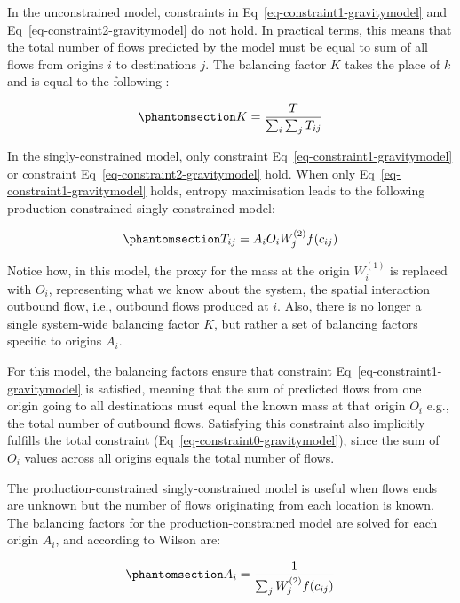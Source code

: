 \documentclass[
  10pt,
  letterpaper,
]{article}
\begin{document}
In the unconstrained model, constraints in
Eq~\ref{eq-constraint1-gravitymodel} and
Eq~\ref{eq-constraint2-gravitymodel} do not hold. In practical terms,
this means that the total number of flows predicted by the model must be
equal to sum of all flows from origins \(i\) to destinations \(j\). The
balancing factor \(K\) takes the place of \(k\) and is equal to the
following \citep[as specified in][ and
\citet{fotheringham_spatial_1984}]{cliff_evaluating_1974}:

\begin{equation}\phantomsection\label{eq-total-flow-balancing-factor}{
K=\frac{T}{\sum_i\sum_j T_{ij}}
}\end{equation}

In the singly-constrained model, only constraint
Eq~\ref{eq-constraint1-gravitymodel} or constraint
Eq~\ref{eq-constraint2-gravitymodel} hold. When only
Eq~\ref{eq-constraint1-gravitymodel} holds, entropy maximisation leads
to the following production-constrained singly-constrained model:

\begin{equation}\phantomsection\label{eq-production-constrained-gravitymodel}{
T_{ij} = A_i O_i W_j^{(2)} f(c_{ij})
}\end{equation}

Notice how, in this model, the proxy for the mass at the origin
\(W_i^{(1)}\) is replaced with \(O_i\), representing what we know about
the system, the spatial interaction outbound flow, i.e., outbound flows
produced at \(i\). Also, there is no longer a single system-wide
balancing factor \(K\), but rather a set of balancing factors specific
to origins \(A_i\).

For this model, the balancing factors ensure that constraint
Eq~\ref{eq-constraint1-gravitymodel} is satisfied, meaning that the sum
of predicted flows from one origin going to all destinations must equal
the known mass at that origin \(O_i\) e.g., the total number of outbound
flows. Satisfying this constraint also implicitly fulfills the total
constraint (Eq~\ref{eq-constraint0-gravitymodel}), since the sum of
\(O_i\) values across all origins equals the total number of flows.

The production-constrained singly-constrained model is useful when flows
ends are unknown but the number of flows originating from each location
is known. The balancing factors for the production-constrained model are
solved for each origin \(A_i\), and according to Wilson are:

\begin{equation}\phantomsection\label{eq-production-constrained-balancing-factor}{
A_i = \frac{1}{\sum_j W_j^{(2)} f(c_{ij})}
}\end{equation}
\end{document}
